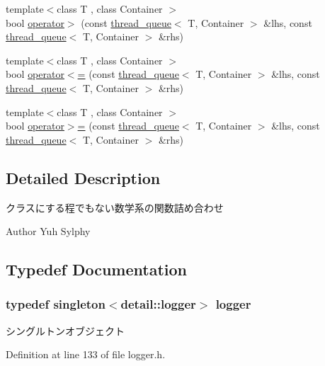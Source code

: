 \begin{DoxyCompactItemize}
\item 
{\footnotesize template$<$class T , class Container $>$ }\\bool \hyperlink{namespaceyuh_a90c7552eaca11ce5f0d3d1e55b3e31a4}{operator$>$} (const \hyperlink{classyuh_1_1thread__queue}{thread\-\_\-queue}$<$ \-T, \-Container $>$ \&lhs, const \hyperlink{classyuh_1_1thread__queue}{thread\-\_\-queue}$<$ \-T, \-Container $>$ \&rhs)
\item 
{\footnotesize template$<$class T , class Container $>$ }\\bool \hyperlink{namespaceyuh_aba0d432a07a5b925326f546cf7fa695f}{operator$<$=} (const \hyperlink{classyuh_1_1thread__queue}{thread\-\_\-queue}$<$ \-T, \-Container $>$ \&lhs, const \hyperlink{classyuh_1_1thread__queue}{thread\-\_\-queue}$<$ \-T, \-Container $>$ \&rhs)
\item 
{\footnotesize template$<$class T , class Container $>$ }\\bool \hyperlink{namespaceyuh_ac900ae8e985fb9b865c99e3a2ab84d07}{operator$>$=} (const \hyperlink{classyuh_1_1thread__queue}{thread\-\_\-queue}$<$ \-T, \-Container $>$ \&lhs, const \hyperlink{classyuh_1_1thread__queue}{thread\-\_\-queue}$<$ \-T, \-Container $>$ \&rhs)
\end{DoxyCompactItemize}


\subsection{\-Detailed \-Description}
クラスにする程でもない数学系の関数詰め合わせ \begin{DoxyAuthor}{\-Author}
\-Yuh \-Sylphy 
\end{DoxyAuthor}


\subsection{\-Typedef \-Documentation}
\hypertarget{namespaceyuh_a3ab03e295f13e50ad34282511114d186}{
\subsubsection[{logger}]{\setlength{\rightskip}{0pt plus 5cm}typedef {\bf singleton}$<${\bf detail\-::logger}$>$ {\bf logger}}}\label{d5/d2b/namespaceyuh_a3ab03e295f13e50ad34282511114d186}
シングルトンオブジェクト 

\-Definition at line 133 of file logger.\-h.

